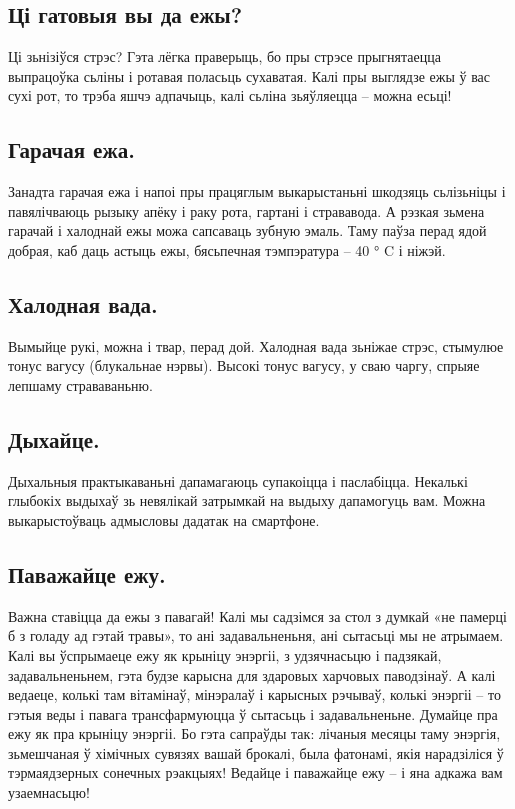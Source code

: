 \subsection{Ці гатовыя вы да ежы?}
Ці зьнізіўся стрэс? Гэта лёгка праверыць, бо пры стрэсе прыгнятаецца выпрацоўка сьліны і ротавая поласьць сухаватая. Калі пры выглядзе ежы ў вас сухі рот, то трэба яшчэ адпачыць, калі сьліна зьяўляецца – можна есьці!

\subsection{Гарачая ежа.}
Занадта гарачая ежа і напоі пры працяглым выкарыстаньні шкодзяць сьлізьніцы і павялічваюць рызыку апёку і раку рота, гартані і стрававода. А рэзкая зьмена гарачай і халоднай ежы можа сапсаваць зубную эмаль. Таму паўза перад ядой добрая, каб даць астыць ежы, бясьпечная тэмпэратура – 40 ° C і ніжэй.

\subsection{Халодная вада.}
Вымыйце рукі, можна і твар, перад дой. Халодная вада зьніжае стрэс, стымулюе тонус вагусу (блукальнае нэрвы). Высокі тонус вагусу, у сваю чаргу, спрыяе лепшаму страваваньню.

\subsection{Дыхайце.}
Дыхальныя практыкаваньні дапамагаюць супакоіцца і паслабіцца. Некалькі глыбокіх выдыхаў зь невялікай затрымкай на выдыху дапамогуць вам. Можна выкарыстоўваць адмысловы дадатак на смартфоне.

\subsection{Паважайце ежу.}
Важна ставіцца да ежы з павагай! Калі мы садзімся за стол з думкай «не памерці б з голаду ад гэтай травы», то ані задавальненьня, ані сытасьці мы не атрымаем. Калі вы ўспрымаеце ежу як крыніцу энэргіі, з удзячнасьцю і падзякай, задавальненьнем, гэта будзе карысна для здаровых харчовых паводзінаў. А калі ведаеце, колькі там вітамінаў, мінэралаў і карысных рэчываў, колькі энэргіі – то гэтыя веды і павага трансфармуюцца ў сытасьць і задавальненьне. Думайце пра ежу як пра крыніцу энэргіі. Бо гэта сапраўды так: лічаныя месяцы таму энэргія, зьмешчаная ў хімічных сувязях вашай брокалі, была фатонамі, якія нарадзіліся ў тэрмаядзерных сонечных рэакцыях! Ведайце і паважайце ежу – і яна адкажа вам узаемнасьцю!


